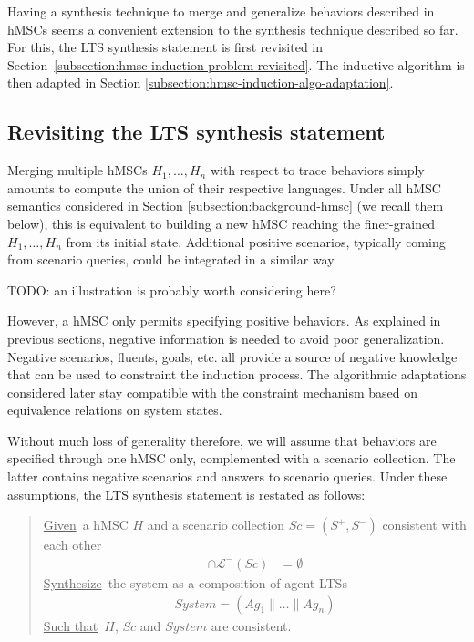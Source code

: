 Having a synthesis technique to merge and generalize behaviors described in hMSCs seems a convenient extension to the synthesis technique described so far. For this, the LTS synthesis statement is first revisited in Section~\ref{subsection:hmsc-induction-problem-revisited}. The inductive algorithm is then adapted in Section \ref{subsection:hmsc-induction-algo-adaptation}.

\subsection{Revisiting the LTS synthesis statement\label{subsection:hmsc-induction-problem-revisited}}

Merging multiple hMSCs $H_1,\ldots,H_n$ with respect to trace behaviors simply amounts to compute the union of their respective languages. Under all hMSC semantics considered in Section \ref{subsection:background-hmsc} (we recall them below), this is equivalent to building a new hMSC reaching the finer-grained $H_1,\ldots,H_n$ from its initial state. Additional positive scenarios, typically coming from scenario queries, could be integrated in a similar way.

TODO: an illustration is probably worth considering here?

However, a hMSC only permits specifying positive behaviors. As explained in previous sections, negative information is needed to avoid poor generalization. Negative scenarios, fluents, goals, etc. all provide a source of negative knowledge that can be used to constraint the induction process. The algorithmic adaptations considered later stay compatible with the constraint mechanism based on equivalence relations on system states.

Without much loss of generality therefore, we will assume that behaviors are specified through one hMSC only, complemented with a scenario collection. The latter contains negative scenarios and answers to scenario queries. Under these assumptions, the LTS synthesis statement is restated as follows: 

\begin{quote}
\underline{Given}~a hMSC $H$ and a scenario collection $Sc = (S^+,S^-)$ consistent with each other
\begin{align*}
[\mathcal{L}^+(Sc) \cup \mathcal{L}(H)] \cap \mathcal{L}^-(Sc) &= \emptyset
\end{align*}
\underline{Synthesize}~the system as a composition of agent LTSs
\begin{align*}
System = (Ag_1 \parallel \ldots \parallel Ag_n)
\end{align*}
\underline{Such that}~$H$, $Sc$ and $System$ are consistent.
\end{quote}

